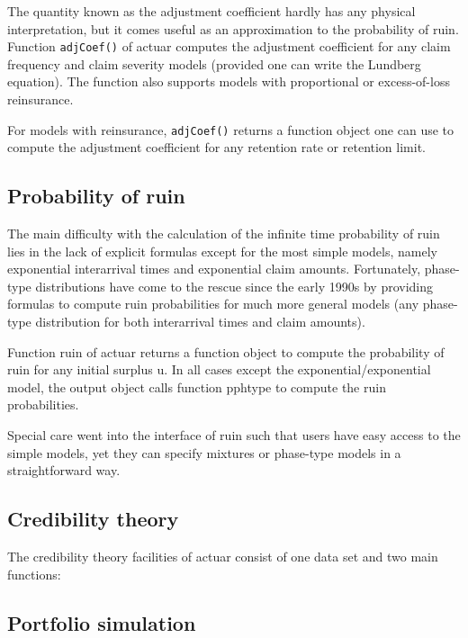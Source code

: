 \documentclass[12pt]{article}
\begin{document}
The quantity known as the adjustment coefficient hardly has any physical interpretation, but it comes useful as an approximation to the probability of ruin. Function \texttt{adjCoef()} of actuar computes the adjustment coefficient for any claim frequency and claim severity models (provided one can write the Lundberg equation). The function also supports models with proportional or excess-of-loss reinsurance.

For models with reinsurance, \texttt{adjCoef()} returns a function object one can use to compute the adjustment coefficient for any retention rate or retention limit.

\subsection{Probability of ruin}

The main difficulty with the calculation of the infinite time probability of ruin lies in the lack of explicit formulas except for the most simple models, namely exponential interarrival times and exponential claim amounts. Fortunately, phase-type distributions have come to the rescue since the early 1990s by providing formulas to compute ruin probabilities for much more general models (any phase-type distribution for both interarrival times and claim amounts).

Function ruin of actuar returns a function object to compute the probability of ruin for any initial surplus u. In all cases except the exponential/exponential model, the output object calls function pphtype to compute the ruin probabilities.

Special care went into the interface of ruin such that users have easy access to the simple models, yet they can specify mixtures or phase-type models in a straightforward way.

\subsection{Credibility theory}

The credibility theory facilities of actuar consist of one data set and two main functions: 

\subsection{Portfolio simulation}
\end{document}
